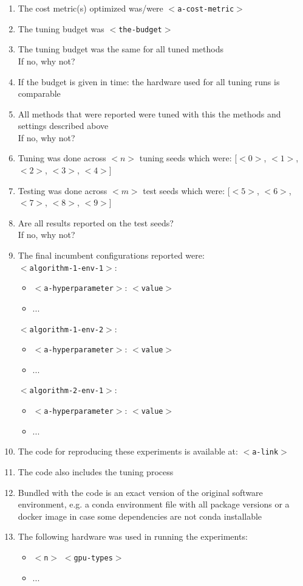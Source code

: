 \documentclass{article}
\newcommand{\cmark}{\ding{51}}%
\newcommand{\xmark}{\ding{55}}%
\begin{document}
\begin{enumerate}
    \item The cost metric(s) optimized was/were \texttt{$<$a-cost-metric$>$}
    \item The tuning budget was \texttt{$<$the-budget$>$}
    \item The tuning budget was the same for all tuned methods \cmark \xmark \\ If no, why not?
    \item If the budget is given in time: the hardware used for all tuning runs is comparable \cmark \xmark
    \item All methods that were reported were tuned with this the methods and settings described above \cmark \xmark \\ If no, why not?
    \item Tuning was done across $<n>$ tuning seeds which were: [$<0>$, $<1>$, $<2>$, $<3>$, $<4>$]
    \item Testing was done across $<m>$ test seeds which were: [$<5>$, $<6>$, $<7>$, $<8>$, $<9>$]
    \item Are all results reported on the test seeds? \cmark \xmark \\ If no, why not?
    \item The final incumbent configurations reported were: \\ \texttt{$<$algorithm-1-env-1$>$}:
    \begin{itemize}
        \item \texttt{$<$a-hyperparameter$>$}: \texttt{$<$value$>$}
        \item ...
    \end{itemize}
    \texttt{$<$algorithm-1-env-2$>$}:
    \begin{itemize}
        \item \texttt{$<$a-hyperparameter$>$}: \texttt{$<$value$>$}
        \item ...
    \end{itemize}
    \texttt{$<$algorithm-2-env-1$>$}:
    \begin{itemize}
        \item \texttt{$<$a-hyperparameter$>$}: \texttt{$<$value$>$}
        \item ...
    \end{itemize}
    \item The code for reproducing these experiments is available at: \texttt{$<$a-link$>$}
    \item The code also includes the tuning process \cmark \xmark
    \item Bundled with the code is an exact version of the original software environment, e.g. a conda environment file with all package versions or a docker image in case some dependencies are not conda installable \cmark \xmark
    \item The following hardware was used in running the experiments:
    \begin{itemize}
        \item \texttt{$<$n$>$} \texttt{$<$gpu-types$>$}
        \item ...
    \end{itemize}
\end{enumerate}
\end{document}
